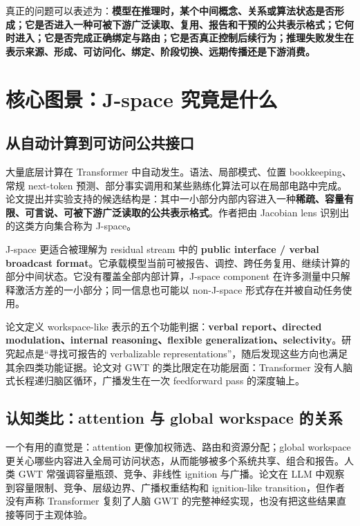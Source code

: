 \documentclass[10.5pt,a4paper]{ctexart}
\begin{document}
\begin{keybox}[title={\bfseries 本笔记的最终研究对象}]
真正的问题可以表述为：\textbf{模型在推理时，某个中间概念、关系或算法状态是否形成；它是否进入一种可被下游广泛读取、复用、报告和干预的公共表示格式；它何时进入；它是否完成正确绑定与路由；它是否真正控制后续行为；推理失败发生在表示来源、形成、可访问化、绑定、阶段切换、远期传播还是下游消费。}
\end{keybox}

\section{核心图景：J-space 究竟是什么}

\subsection{从自动计算到可访问公共接口}
大量底层计算在 Transformer 中自动发生。语法、局部模式、位置 bookkeeping、常规 next-token 预测、部分事实调用和某些熟练化算法可以在局部电路中完成。论文提出并实验支持的候选结构是：其中一小部分内部内容进入一种\textbf{稀疏、容量有限、可言说、可被下游广泛读取的公共表示格式}。作者把由 Jacobian lens 识别出的这类方向集合称为 J-space。

J-space 更适合被理解为 residual stream 中的 \textbf{public interface / verbal broadcast format}。它承载模型当前可被报告、调控、跨任务复用、继续计算的部分中间状态。它没有覆盖全部内部计算，J-space component 在许多测量中只解释激活方差的一小部分；同一信息也可能以 non-J-space 形式存在并被自动任务使用。

\begin{paperclaim}
论文定义 workspace-like 表示的五个功能判据：\textbf{verbal report、directed modulation、internal reasoning、flexible generalization、selectivity}。研究起点是“寻找可报告的 verbalizable representations”，随后发现这些方向也满足其余四类功能证据。论文对 GWT 的类比限定在功能层面：Transformer 没有人脑式长程递归脑区循环，广播发生在一次 feedforward pass 的深度轴上。
\end{paperclaim}

\subsection{认知类比：attention 与 global workspace 的关系}
一个有用的直觉是：attention 更像加权筛选、路由和资源分配；global workspace 更关心哪些内容进入全局可访问状态，从而能够被多个系统共享、组合和报告。人类 GWT 常强调容量瓶颈、竞争、非线性 ignition 与广播。论文在 LLM 中观察到容量限制、竞争、层级边界、广播权重结构和 ignition-like transition，但作者没有声称 Transformer 复刻了人脑 GWT 的完整神经实现，也没有把这些结果直接等同于主观体验。
\end{document}
